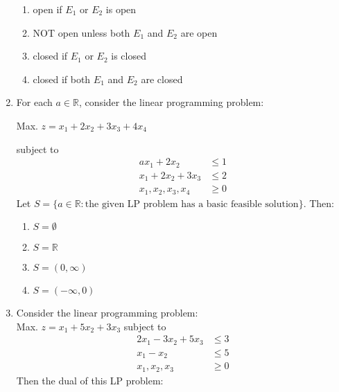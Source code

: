 \documentclass[journal]{IEEEtran}
\numberwithin{equation}{enumi}
\numberwithin{figure}{enumi}
\begin{document}
\begin{enumerate}
    \begin{enumerate}
       
        \item open if $E_1$ or $E_2$ is open
        \item NOT open unless both $E_1$ and $E_2$ are open
        \item closed if $E_1$ or $E_2$ is closed
        \item closed if both $E_1$ and $E_2$ are closed
    \end{enumerate}

\item For each $a \in \mathbb{R}$, consider the linear programming problem:
 
   \begin{flushleft}
    \hspace{3cm} Max. $z = x_1 + 2x_2 + 3x_3 + 4x_4$
   \end{flushleft}
    \hspace{3cm} subject to \hfill{}
    \begin{align*}
        ax_1 + 2x_2 &\leq 1 \\
        x_1 + 2x_2 + 3x_3 &\leq 2 \\
        x_1, x_2, x_3, x_4 &\geq 0
    \end{align*}
    Let $S = \{a \in \mathbb{R} : \text{the given LP problem has a basic feasible solution}\}$. Then:
    \begin{multicols}{2}
    \begin{enumerate}
        \item $S = \emptyset$
        \item $S = \mathbb{R}$
        \item $S = (0, \infty)$
        \item $S = (-\infty, 0)$
    \end{enumerate}
    \end{multicols}
    


\item Consider the linear programming problem:\\
   \hspace{3cm} Max. $z = x_1 + 5x_2 + 3x_3$
   \hspace{3cm} subject to
    \begin{align*}
        2x_1 - 3x_2 + 5x_3 &\leq 3 \\
        x_1 - x_2 &\leq 5 \\
        x_1, x_2, x_3 &\geq 0
    \end{align*}
    Then the dual of this LP problem:
     \hfill{}
    

\end{enumerate}
\end{document}
